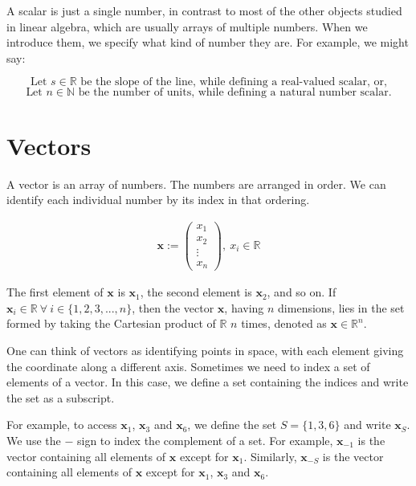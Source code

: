A scalar is just a single number, in contrast to most of the other objects studied in linear algebra, which are usually arrays of multiple numbers. When we introduce them, we specify what kind of number they are. For example, we might say:

\[
\text{Let } s \in \mathbb{R} \text{ be the slope of the line, while defining a real-valued scalar, or,}
\]
\[
\text{Let } n \in \mathbb{N} \text{ be the number of units, while defining a natural number scalar.}
\]

\section{Vectors}

A vector is an array of numbers. The numbers are arranged in order. We can identify each individual number by its index in that ordering.

\begin{align}
\mathbf{x} := \begin{pmatrix} x_{1} \\ x_{2} \\ \vdots \\ x_{n} \end{pmatrix}, \ x_{i} \in \mathbb{R}
\end{align}

The first element of \(\mathbf{x}\) is \(\mathbf{x}_{1}\), the second element is \(\mathbf{x}_{2}\), and so on.
If \(\mathbf{x}_{i} \in \mathbb{R} \ \forall \ i \in \{ 1,2,3,...,n\}\), then the vector \(\mathbf{x}\), having \(n\) dimensions, lies in the set formed by taking the Cartesian product of \(\mathbb{R}\) \(n\) times, denoted as \(\mathbf{x} \in \mathbb{R}^{n}\).
\para

One can think of vectors as identifying points in space, with each element giving the coordinate along a different axis. Sometimes we need to index a set of elements of a vector. In this case, we define a set containing the indices and write the set as a subscript.
\para

For example, to access \(\mathbf{x}_1\), \(\mathbf{x}_3\) and \(\mathbf{x}_6\), we define the set \(S = \{1,3,6\}\) and write \(\mathbf{x}_S\). We use the \( - \) sign to index the complement of a set. For example, \(\mathbf{x}_{-1}\) is the vector containing all elements of \(\mathbf{x}\) except for \(\mathbf{x}_1\). Similarly, \(\mathbf{x}_{-S}\) is the vector containing all elements of \(\mathbf{x}\) except for \(\mathbf{x}_1\), \(\mathbf{x}_3\) and \(\mathbf{x}_6\).

